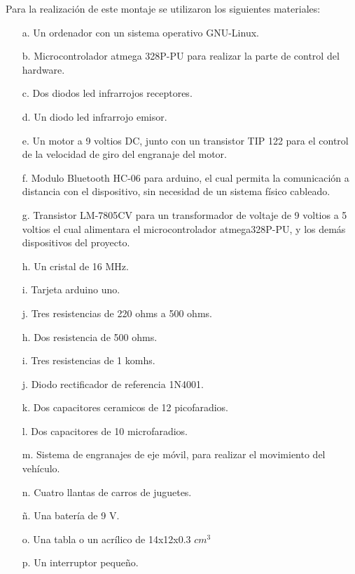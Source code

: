\documentclass[12]{article}
\begin{document}
\begin{multicols}{2}
Para la realización de este montaje se utilizaron los siguientes materiales:
\begin{enumerate}
\item[a.] Un ordenador con un sistema operativo GNU-Linux.
\item[b.] Microcontrolador atmega 328P-PU \cite{ARDUINO} para realizar la parte de control del hardware.
\item[c.] Dos diodos led infrarrojos receptores.
\item[d.] Un diodo led infrarrojo emisor.
\item[e.] Un motor a 9 voltios DC, junto con un transistor TIP 122\cite{TIP122}   para el control de la velocidad de giro del engranaje del motor.
\item[f.] Modulo Bluetooth HC-06 para arduino, el cual permita la comunicación a distancia con el dispositivo, sin necesidad de un sistema físico cableado.
\item[g.] Transistor LM-7805CV \cite{REGULADOR} para un transformador de voltaje de 9 voltios a 5 voltios el cual alimentara el microcontrolador atmega328P-PU, y los demás dispositivos del proyecto.
\item[h.] Un cristal de 16 MHz.
\item[i.] Tarjeta arduino \cite{ARDUINO} uno.
\item[j.] Tres resistencias de 220 ohms a 500 ohms.
\item[h.] Dos resistencia de 500 ohms.
\item[i.] Tres resistencias de 1 komhs.
\item[j.] Diodo rectificador de referencia 1N4001. \cite{DIODO}
\item[k.] Dos capacitores ceramicos de 12 picofaradios.
\item[l.] Dos capacitores de 10 microfaradios.
\item[m.] Sistema de engranajes de eje móvil, para realizar el movimiento del vehículo.
\item[n.] Cuatro llantas de carros de juguetes.
\item[ñ.] Una batería de 9 V.
\item[o.] Una tabla o un acrílico de 14x12x0.3 $cm^{3}$
\item[p.] Un interruptor pequeño.
\end{enumerate}


\end{multicols}
\end{document}

